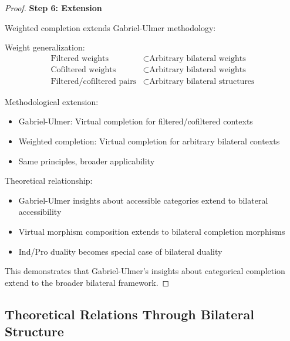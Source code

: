 \documentclass[11pt]{article}
\theoremstyle{plain}
\theoremstyle{definition}
\theoremstyle{remark}
\begin{document}
\begin{proof}
\textbf{Step 6: Extension}

Weighted completion extends Gabriel-Ulmer methodology:

Weight generalization:
\begin{align}
\text{Filtered weights} &\subset \text{Arbitrary bilateral weights} \\
\text{Cofiltered weights} &\subset \text{Arbitrary bilateral weights} \\
\text{Filtered/cofiltered pairs} &\subset \text{Arbitrary bilateral structures}
\end{align}

Methodological extension:
\begin{itemize}
\item Gabriel-Ulmer: Virtual completion for filtered/cofiltered contexts
\item Weighted completion: Virtual completion for arbitrary bilateral contexts
\item Same principles, broader applicability
\end{itemize}

Theoretical relationship:
\begin{itemize}
\item Gabriel-Ulmer insights about accessible categories extend to bilateral accessibility
\item Virtual morphism composition extends to bilateral completion morphisms
\item Ind/Pro duality becomes special case of bilateral duality
\end{itemize}

This demonstrates that Gabriel-Ulmer's insights about categorical completion extend to the broader bilateral framework.
\end{proof}

\subsection{Theoretical Relations Through Bilateral Structure}
\end{document}
